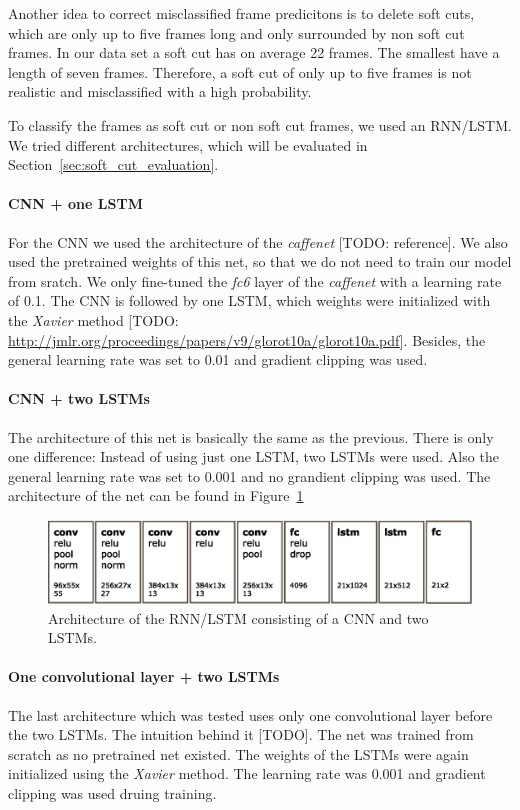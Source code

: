 Another idea to correct misclassified frame predicitons is to delete soft cuts, which are only up to five frames long and only surrounded by non soft cut frames.
In our data set a soft cut has on average 22 frames.
The smallest have a length of seven frames.
Therefore, a soft cut of only up to five frames is not realistic and misclassified with a high probability.

To classify the frames as soft cut or non soft cut frames, we used an RNN/LSTM.
We tried different architectures, which will be evaluated in Section~\ref{sec:soft_cut_evaluation}.

\paragraph{CNN + one LSTM}
For the CNN we used the architecture of the \textit{caffenet} [TODO: reference].
We also used the pretrained weights of this net, so that we do not need to train our model from sratch.
We only fine-tuned the \textit{fc6} layer of the \textit{caffenet} with a learning rate of 0.1.
The CNN is followed by one LSTM, which weights were initialized with the \textit{Xavier} method [TODO: \url{http://jmlr.org/proceedings/papers/v9/glorot10a/glorot10a.pdf}].
Besides, the general learning rate was set to 0.01 and gradient clipping was used.

\paragraph{CNN + two LSTMs}
The architecture of this net is basically the same as the previous.
There is only one difference: Instead of using just one LSTM, two LSTMs were used.
Also the general learning rate was set to 0.001 and no grandient clipping was used.
The architecture of the net can be found in Figure~\ref{fig:net_architecture}
\begin{figure}[!htb]
	\centering
	\includegraphics[scale=.5]{images/net_architecture.eps}
	\caption{Architecture of the RNN/LSTM consisting of a CNN and two LSTMs.}
	\label{fig:net_architecture}
\end{figure}

\paragraph{One convolutional layer + two LSTMs}
The last architecture which was tested uses only one convolutional layer before the two LSTMs.
The intuition behind it [TODO].
The net was trained from scratch as no pretrained net existed.
The weights of the LSTMs were again initialized using the \textit{Xavier} method.
The learning rate was 0.001 and gradient clipping was used druing training.